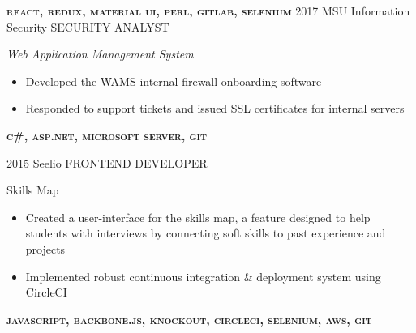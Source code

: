 \documentclass[]{friggeri-cv}
\begin{document}
\begin{entrylist}
{    \textbf{\textsc{react, redux, material ui, perl,  gitlab, selenium}}
    \vspace{10pt}
  }
\entry
  {2017}
  {\textcolor{gray}{\FA \faLock} MSU Information Security}
  {SECURITY ANALYST}
  {
    \textit{Web Application Management System}
    \begin{itemize}[topsep=6pt,leftmargin=0pt,itemsep=6pt]
      \item Developed the WAMS internal firewall onboarding software %
      \item Responded to support tickets and issued SSL certificates for internal servers 
    \end{itemize}
    \textbf{\textsc{c\#, asp.net, microsoft server, git}}
    \vspace{10pt}
  }
\entry
  {2015}
  {\textcolor{gray}{\FA \faMapMarker} \href{http://www.seelio.com/}{Seelio} }
  {FRONTEND DEVELOPER}
  {
    Skills Map
    \begin{itemize}[topsep=6pt,leftmargin=0pt,itemsep=6pt]
      \item Created a user-interface for the skills map, a feature designed
        to help students with interviews by connecting soft skills to past experience and projects
      \item {
          Implemented  robust continuous integration \& deployment system using CircleCI%
        }
    \end{itemize}
    \textbf{\textsc{javascript, backbone.js, knockout, circleci, selenium, aws, git}}
    \vspace{10pt}
  }


\end{entrylist}
\end{document}
